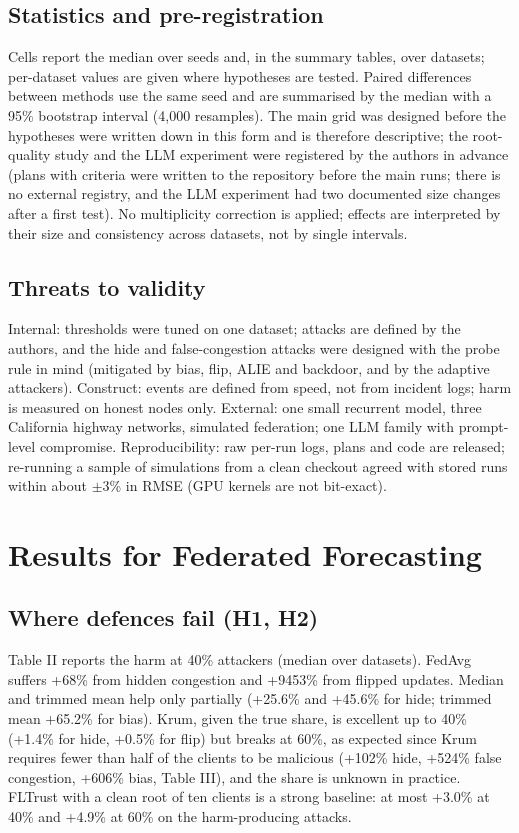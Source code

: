 \documentclass[journal]{IEEEtran}
\begin{document}
\subsection{Statistics and pre-registration}
Cells report the median over seeds and, in the summary tables, over datasets; per-dataset values are given where hypotheses are tested. Paired differences between methods use the same seed and are summarised by the median with a 95\% bootstrap interval (4,000 resamples). The main grid was designed before the hypotheses were written down in this form and is therefore descriptive; the root-quality study and the LLM experiment were registered by the authors in advance (plans with criteria were written to the repository before the main runs; there is no external registry, and the LLM experiment had two documented size changes after a first test). No multiplicity correction is applied; effects are interpreted by their size and consistency across datasets, not by single intervals.

\subsection{Threats to validity}
Internal: thresholds were tuned on one dataset; attacks are defined by the authors, and the hide and false-congestion attacks were designed with the probe rule in mind (mitigated by bias, flip, ALIE and backdoor, and by the adaptive attackers). Construct: events are defined from speed, not from incident logs; harm is measured on honest nodes only. External: one small recurrent model, three California highway networks, simulated federation; one LLM family with prompt-level compromise. Reproducibility: raw per-run logs, plans and code are released; re-running a sample of simulations from a clean checkout agreed with stored runs within about \ensuremath{\pm}3\% in RMSE (GPU kernels are not bit-exact).

\section{Results for Federated Forecasting}
\subsection{Where defences fail (H1, H2)}
Table II reports the harm at 40\% attackers (median over datasets). FedAvg suffers +68\% from hidden congestion and +9453\% from flipped updates. Median and trimmed mean help only partially (+25.6\% and +45.6\% for hide; trimmed mean +65.2\% for bias). Krum, given the true share, is excellent up to 40\% (+1.4\% for hide, +0.5\% for flip) but breaks at 60\%, as expected since Krum requires fewer than half of the clients to be malicious (+102\% hide, +524\% false congestion, +606\% bias, Table III), and the share is unknown in practice. FLTrust with a clean root of ten clients is a strong baseline: at most +3.0\% at 40\% and +4.9\% at 60\% on the harm-producing attacks.
\end{document}
